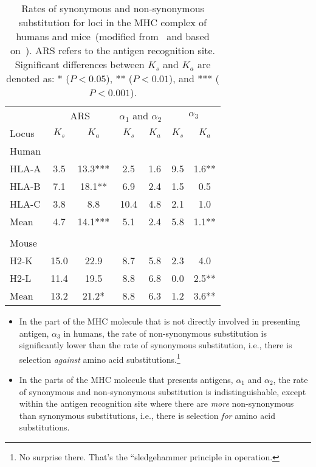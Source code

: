 \begin{table}
\begin{center}
\begin{tabular}{lcccccc}
\hline\hline
      & \multicolumn{2}{c}{ARS} 
      & \multicolumn{2}{c}{$\alpha_1$ and $\alpha_2$}
      & \multicolumn{2}{c}{$\alpha_3$} \\
Locus & $K_s$ & $K_a$ & $K_s$ & $K_a$ & $K_s$ & $K_a$ \\
\hline
Human \\
\quad HLA-A & 3.5 & 13.3*** &  2.5 & 1.6 & 9.5 & 1.6** \\
\quad HLA-B & 7.1 & 18.1**  &  6.9 & 2.4 & 1.5 & 0.5 \\
\quad HLA-C & 3.8 &  8.8    & 10.4 & 4.8 & 2.1 & 1.0 \\
Mean        & 4.7 & 14.1*** &  5.1 & 2.4 & 5.8 & 1.1** \\
\\
Mouse \\
\quad H2-K  & 15.0 & 22.9   &  8.7 & 5.8 & 2.3 & 4.0 \\
\quad H2-L  & 11.4 & 19.5   &  8.8 & 6.8 & 0.0 & 2.5** \\
Mean        & 13.2 & 21.2*  &  8.8 & 6.3 & 1.2 & 3.6** \\
\hline
\end{tabular}
\end{center}
\caption{Rates of synonymous and non-synonymous substitution for loci
  in the MHC complex of humans and mice~(modified from~\cite{Li97} and
  based on~\cite{Hughes-Nei88}). ARS refers to the antigen recognition
  site. Significant differences between $K_s$ and $K_a$ are denoted
  as: * ($P < 0.05$), ** ($P < 0.01$), and *** ($P <
  0.001$).}\label{table:hughes-nei}
\end{table}

\begin{itemize}

\item In the part of the MHC molecule that is not directly involved in
  presenting antigen, $\alpha_3$ in humans, the rate of non-synonymous
  substitution is significantly lower than the rate of synonymous
  substitution, i.e., there is selection {\it against\/} amino acid
  substitutions.\footnote{No surprise there. That's the ``sledgehammer
    principle in operation.}

\item In the parts of the MHC molecule that presents antigens,
  $\alpha_1$ and $\alpha_2$, the rate of synonymous and non-synonymous
  substitution is indistinguishable, except within the antigen
  recognition site where there are {\it more\/} non-synonymous than
  synonymous substitutions, i.e., there is selection {\it for\/} amino
  acid substitutions.

\end{itemize}

